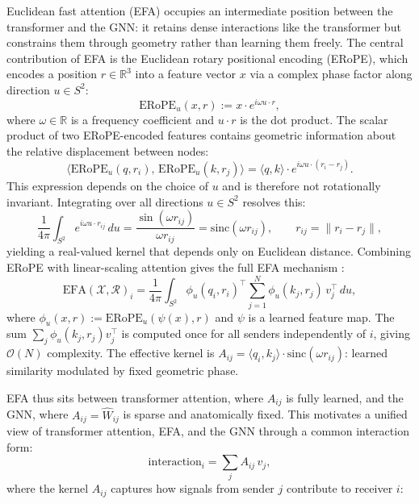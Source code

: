 \documentclass[11pt]{article}
\begin{document}
Euclidean fast attention (EFA) \citep{frank2026efa} occupies an
intermediate position between the transformer and the GNN: it
retains dense interactions like the transformer but constrains
them through geometry rather than learning them freely. The central contribution of EFA is the Euclidean rotary positional encoding (ERoPE), which encodes a position $r \in \mathbb{R}^3$ into a feature vector $x$ via a complex phase factor along direction
$u \in S^2$:
\begin{equation}
\mathrm{ERoPE}_u(x, r) := x \cdot e^{i\omega u \cdot r},
\label{eq:erope}
\end{equation}
where $\omega \in \mathbb{R}$ is a frequency coefficient and
$u \cdot r$ is the dot product.
The scalar product of two ERoPE-encoded features contains geometric
information about the relative displacement between nodes:
\begin{equation}
\langle \mathrm{ERoPE}_u(q, r_i),\, \mathrm{ERoPE}_u(k, r_j)\rangle
= \langle q, k\rangle \cdot e^{i\omega u \cdot (r_i - r_j)}.
\end{equation}
This expression depends on the choice of $u$ and is therefore not
rotationally invariant. Integrating over all directions $u \in S^2$
resolves this:
\begin{equation}
\frac{1}{4\pi}\int_{S^2} e^{i\omega u \cdot r_{ij}}\, du
= \frac{\sin(\omega r_{ij})}{\omega r_{ij}} = \mathrm{sinc}(\omega r_{ij}),
\qquad r_{ij} = \|r_i - r_j\|,
\label{eq:sinc}
\end{equation}
yielding a real-valued kernel that depends only on Euclidean distance.
Combining ERoPE with linear-scaling attention gives the full EFA
mechanism \citep{frank2026efa}:
\begin{equation}
\mathrm{EFA}(\mathcal{X}, \mathcal{R})_i =
\frac{1}{4\pi}\int_{S^2}
\phi_u(q_i, r_i)^\top
\sum_{j=1}^{N} \phi_u(k_j, r_j)\, v_j^\top\, du,
\label{eq:efa}
\end{equation}
where $\phi_u(x, r) := \mathrm{ERoPE}_u(\psi(x), r)$ and $\psi$ is a
learned feature map. The sum $\sum_j \phi_u(k_j, r_j) v_j^\top$ is
computed once for all senders independently of $i$, giving
$\mathcal{O}(N)$ complexity. The effective kernel is
$A_{ij} = \langle q_i, k_j\rangle \cdot \mathrm{sinc}(\omega r_{ij})$:
learned similarity modulated by fixed geometric phase.

EFA thus sits between transformer attention, where $A_{ij}$ is
fully learned, and the GNN, where $A_{ij} = \hat{W}_{ij}$ is
sparse and anatomically fixed. This motivates a unified view of transformer attention, EFA, and the
GNN through a common interaction form:
\begin{equation}
\text{interaction}_i = \sum_j A_{ij}\, v_j,
\label{eq:unified}
\end{equation}
where the kernel $A_{ij}$ captures how signals from sender $j$
contribute to receiver $i$:
\end{document}
